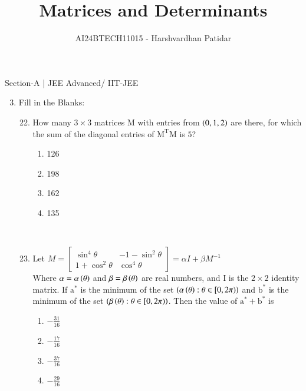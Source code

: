 \documentclass[journal,12pt,twocolumn]{IEEEtran}
\theoremstyle{remark}
\begin{document}

\vspace{3cm}

\title{Matrices and Determinants}
\author{AI24BTECH11015 - Harshvardhan Patidar}
\maketitle
\newpage
\bigskip

\renewcommand{\thefigure}{\theenumi}
\renewcommand{\thetable}{\theenumi}



Section-A | JEE Advanced/ IIT-JEE
 
\begin{enumerate} \setcounter{enumi}{2}
	\item
		Fill in the Blanks:
			\begin{enumerate} \setcounter{enumii}{21}
				\item
					How many $3 \times 3$ matrices M with entries from $\left(0,1,2\right)$ are there, for which the sum of the diagonal entries of $\mathrm{M^TM}$ is $5$?
						\begin{enumerate}
							\item 126
							\item 198
							\item 162
							\item 135
						\end{enumerate}
						\hfill {}\\
				\item
					Let $M= \begin{bmatrix}
						\sin^4 \theta & -1 -\sin^2 \theta\\
						1+\cos^2 \theta & \cos^4 \theta
						\end{bmatrix} = 
						\alpha I + \beta M^{-1}$\\
					Where $\alpha = \alpha \left(\theta\right)$ and $\beta = \beta \left(\theta\right)$ are real numbers, and I is the $2 \times 2$ identity matrix. If $\mathrm{a^*}$ is the minimum of the set $\left(\alpha \left(\theta\right) : \theta \in [0, 2 \pi)\right)$ and $\mathrm{b^*}$ is the minimum of the set $\left(\beta \left(\theta\right) : \theta \in [0, 2 \pi)\right)$. Then the value of $\mathrm{a^*} + \mathrm{b^*}$ is
						\begin{enumerate}
							\item $-\frac{31}{16}$
							\item $-\frac{17}{16}$
							\item $-\frac{37}{16}$
							\item $-\frac{29}{16}$
						\end{enumerate}
						\hfill {}\\
			\end{enumerate}


\end{enumerate}
\end{document}
